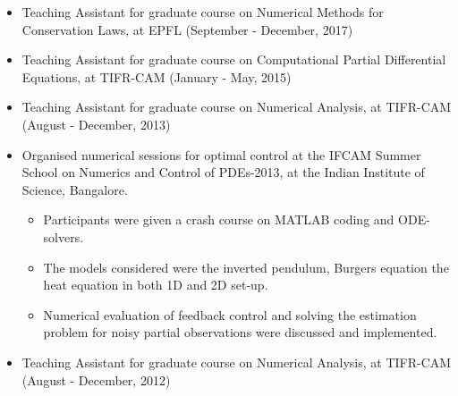 \documentclass[margin]{res}
\begin{document}
\begin{resume}
               \begin{itemize} \itemsep -2pt
                \item Teaching Assistant for graduate course on Numerical Methods for Conservation Laws, at EPFL (September - December, 2017)
               \item Teaching Assistant for graduate course on Computational Partial Differential Equations, at TIFR-CAM (January - May, 2015)
               \item Teaching Assistant for graduate course on Numerical Analysis, at TIFR-CAM  (August - December, 2013)
               \item Organised numerical sessions for optimal control at the IFCAM Summer School on Numerics and Control of PDEs-2013, at the Indian Institute of Science, Bangalore. 
               \begin{itemize}
                 \item Participants were given a crash course on MATLAB coding and ODE-solvers.
                 \item The models considered were the inverted pendulum,  Burgers equation the heat equation in both 1D and 2D set-up.
                 \item Numerical evaluation of feedback control and solving the estimation problem for noisy partial observations were discussed and implemented.
               \end{itemize}
               \item Teaching Assistant for graduate course on Numerical Analysis, at TIFR-CAM   (August - December, 2012)
               \end{itemize}              


\end{resume}
\end{document}
